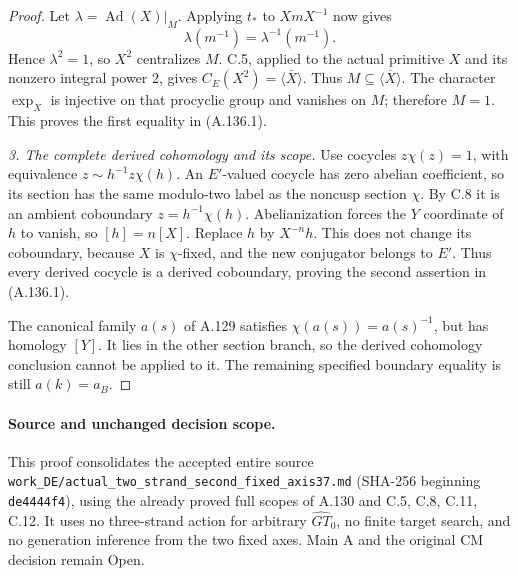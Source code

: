 \begin{proof}
Let \(\lambda=\operatorname{Ad}(X)|_M\). Applying \(t_*\) to
\(XmX^{-1}\) now gives
\[
 \lambda(m^{-1})=\lambda^{-1}(m^{-1}).
\]
Hence \(\lambda^2=1\), so \(X^2\) centralizes \(M\).
C.5, applied to the actual primitive \(X\) and its nonzero
integral power \(2\), gives
\(C_E(X^2)=\overline{\langle X\rangle}\).
Thus \(M\subseteq\overline{\langle X\rangle}\).
The character \(\exp_X\) is injective on that procyclic group
and vanishes on \(M\); therefore \(M=1\).
This proves the first equality in (A.136.1).

\par\smallskip\noindent
\emph{3. The complete derived cohomology and its scope.}
Use cocycles \(z\chi(z)=1\), with equivalence
\(z\sim h^{-1}z\chi(h)\).
An \(E'\)-valued cocycle has zero abelian coefficient, so its
section has the same modulo-two label as the noncusp section
\(\chi\). By C.8 it is an ambient coboundary
\(z=h^{-1}\chi(h)\). Abelianization forces the \(Y\) coordinate
of \(h\) to vanish, so \([h]=n[X]\).
Replace \(h\) by \(X^{-n}h\). This does not change its
coboundary, because \(X\) is \(\chi\)-fixed, and the new
conjugator belongs to \(E'\). Thus every derived cocycle is a
derived coboundary, proving the second assertion in (A.136.1).

The canonical family \(a(s)\) of A.129 satisfies
\(\chi(a(s))=a(s)^{-1}\), but has homology \([Y]\).
It lies in the other section branch, so the derived cohomology
conclusion cannot be applied to it. The remaining specified
boundary equality is still \(a(k)=a_B\).
\end{proof}

\paragraph{Source and unchanged decision scope.}
This proof consolidates the accepted entire source
\texttt{work\_DE/actual\_two\_strand\_second\_fixed\_axis37.md}
(SHA-256 beginning \texttt{de4444f4}), using the already proved
full scopes of A.130 and C.5, C.8, C.11, C.12.
It uses no three-strand action for arbitrary
\(\widehat{GT}_0\), no finite target search, and no generation
inference from the two fixed axes. Main A and the original CM
decision remain Open.
